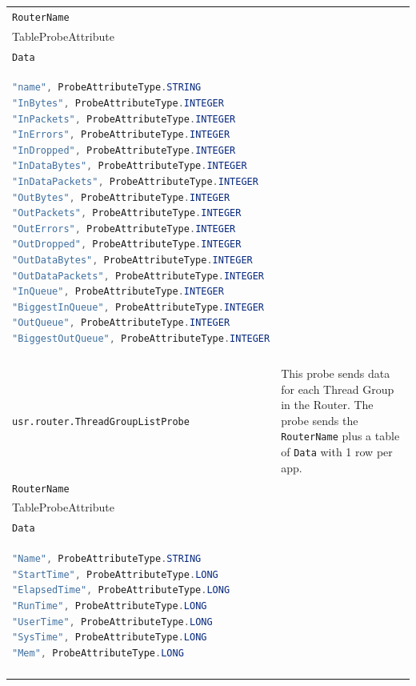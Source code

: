 {\begin{longtable}{ | p{5.7cm} | p{8.7cm} | }
\vspace{\baselineskip}
\begin{tabular}{ p{8.3cm} }
  \hline
  ProbeAttributeType.STRING \\
  \hline
  \texttt{RouterName} \\
  \hline
  TableProbeAttribute \\
  \hline
  \texttt{Data} \\
  \hline
\begin{lstlisting}[language=java]
"name", ProbeAttributeType.STRING
"InBytes", ProbeAttributeType.INTEGER
"InPackets", ProbeAttributeType.INTEGER
"InErrors", ProbeAttributeType.INTEGER
"InDropped", ProbeAttributeType.INTEGER
"InDataBytes", ProbeAttributeType.INTEGER
"InDataPackets", ProbeAttributeType.INTEGER
"OutBytes", ProbeAttributeType.INTEGER
"OutPackets", ProbeAttributeType.INTEGER
"OutErrors", ProbeAttributeType.INTEGER
"OutDropped", ProbeAttributeType.INTEGER
"OutDataBytes", ProbeAttributeType.INTEGER
"OutDataPackets", ProbeAttributeType.INTEGER
"InQueue", ProbeAttributeType.INTEGER
"BiggestInQueue", ProbeAttributeType.INTEGER
"OutQueue", ProbeAttributeType.INTEGER
"BiggestOutQueue", ProbeAttributeType.INTEGER
\end{lstlisting} \\
\hline
\end{tabular}

\\
\hline
\texttt{usr.router.ThreadGroupListProbe} & This probe sends data for
each Thread Group in the Router.  \newline
The probe sends the \texttt{RouterName} plus
a table of \texttt{Data} with 1 row per app.

\vspace{\baselineskip}
\begin{tabular}{ p{8.3cm} }
  \hline
  ProbeAttributeType.STRING \\
  \hline
  \texttt{RouterName} \\
  \hline
  TableProbeAttribute \\
  \hline
  \texttt{Data} \\
  \hline
\begin{lstlisting}[language=java]
"Name", ProbeAttributeType.STRING
"StartTime", ProbeAttributeType.LONG
"ElapsedTime", ProbeAttributeType.LONG
"RunTime", ProbeAttributeType.LONG
"UserTime", ProbeAttributeType.LONG
"SysTime", ProbeAttributeType.LONG
"Mem", ProbeAttributeType.LONG
\end{lstlisting} \\
\hline
\end{tabular}


\end{longtable}}
